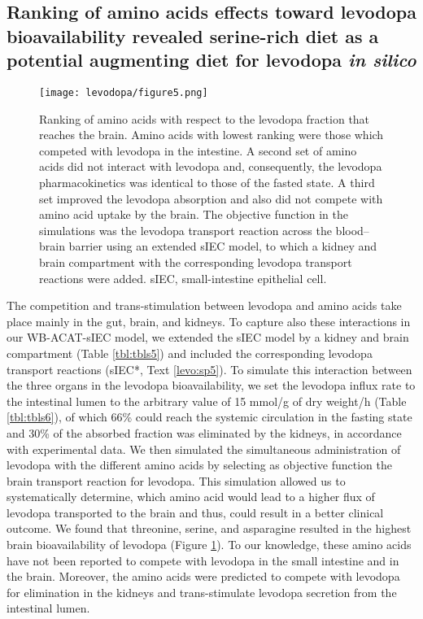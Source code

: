 \subsection{Ranking of amino acids effects toward levodopa bioavailability revealed serine-rich diet as a potential augmenting diet for levodopa \textit{in silico}}
\begin{figure}[!htp]
\centering
	\texttt{[image: levodopa/figure5.png]}%
	\caption[Ranking of amino acids with respect to the levodopa
fraction that reaches the brain.]{Ranking of amino acids with respect to the levodopa
fraction that reaches the brain. Amino acids with lowest ranking
were those which competed with levodopa in the intestine.
A second set of amino acids did not interact with levodopa and,
consequently, the levodopa pharmacokinetics was identical to those
of the fasted state. A third set improved the levodopa absorption
and also did not compete with amino acid uptake by the brain. The
objective function in the simulations was the levodopa transport
reaction across the blood–brain barrier using an extended sIEC
model, to which a kidney and brain compartment with the
corresponding levodopa transport reactions were added. sIEC,
small-intestine epithelial cell.}
	\label{fig:aarank}
\end{figure}
The competition and trans-stimulation between levodopa and amino acids take place mainly in the gut, brain, and kidneys\cite{verrey2000glycoprotein}. To capture also these interactions in our WB-ACAT-sIEC model, we extended the sIEC model by a kidney and brain compartment (Table \ref{tbl:tbls5}) and included the corresponding levodopa transport reactions (sIEC*, Text \ref{levo:sp5}). To simulate this interaction between the three organs in the levodopa bioavailability, we set the levodopa influx rate to the intestinal lumen to the arbitrary value of 15 mmol/g of dry weight/h (Table \ref{tbl:tbls6}), of which 66\% could reach the systemic circulation in the fasting state and
30\% of the absorbed fraction was eliminated by the kidneys, in accordance with experimental data\cite{contin2010pharmacokinetics}. We then simulated the simultaneous administration of levodopa with the different amino acids by selecting as objective function the brain transport reaction for levodopa. This simulation allowed us to systematically determine, which amino acid would lead to a higher flux of levodopa transported to the brain and thus, could result in a better clinical outcome. We found that threonine, serine, and asparagine resulted in the highest brain bioavailability of levodopa (Figure \ref{fig:aarank}). To our knowledge, these amino acids have not been reported to compete with levodopa in the small intestine and in the brain. Moreover, the amino acids were predicted to compete with levodopa for elimination in the kidneys and trans-stimulate levodopa secretion from the intestinal lumen.

